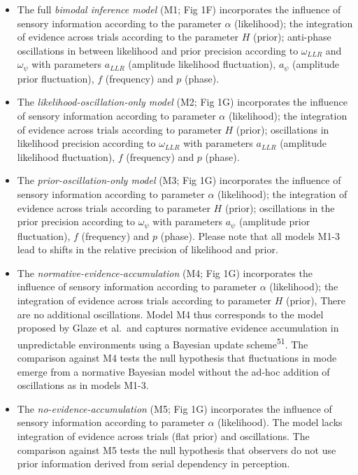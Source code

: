 \documentclass[
]{article}
\begin{document}
\begin{itemize}
\item
  The full \emph{bimodal inference model} (M1; Fig 1F) incorporates
  the influence of sensory information according to the parameter
  \(\alpha\) (likelihood); the integration of evidence across trials
  according to the parameter \(H\) (prior); anti-phase oscillations in
  between likelihood and prior precision according to \(\omega_{LLR}\)
  and \(\omega_{\psi}\) with parameters \(a_{LLR}\) (amplitude
  likelihood fluctuation), \(a_{\psi}\) (amplitude prior fluctuation),
  \(f\) (frequency) and \(p\) (phase).
\item
  The \emph{likelihood-oscillation-only model} (M2; Fig 1G)
  incorporates the influence of sensory information according to
  parameter \(\alpha\) (likelihood); the integration of evidence across
  trials according to parameter \(H\) (prior); oscillations in
  likelihood precision according to \(\omega_{LLR}\) with parameters
  \(a_{LLR}\) (amplitude likelihood fluctuation), \(f\) (frequency) and
  \(p\) (phase).
\item
  The \emph{prior-oscillation-only model} (M3; Fig 1G) incorporates
  the influence of sensory information according to parameter \(\alpha\)
  (likelihood); the integration of evidence across trials according to
  parameter \(H\) (prior); oscillations in the prior precision according
  to \(\omega_{\psi}\) with parameters \(a_{\psi}\) (amplitude prior
  fluctuation), \(f\) (frequency) and \(p\) (phase). Please note that
  all models M1-3 lead to shifts in the relative precision of likelihood
  and prior.
\item
  The \emph{normative-evidence-accumulation} (M4; Fig 1G)
  incorporates the influence of sensory information according to
  parameter \(\alpha\) (likelihood); the integration of evidence across
  trials according to parameter \(H\) (prior), There are no additional
  oscillations. Model M4 thus corresponds to the model proposed by Glaze
  et al.~and captures normative evidence accumulation in unpredictable
  environments using a Bayesian update scheme\textsuperscript{51}. The
  comparison against M4 tests the null hypothesis that fluctuations in
  mode emerge from a normative Bayesian model without the ad-hoc
  addition of oscillations as in models M1-3.
\item
  The \emph{no-evidence-accumulation} (M5; Fig 1G) incorporates the
  influence of sensory information according to parameter \(\alpha\)
  (likelihood). The model lacks integration of evidence across trials
  (flat prior) and oscillations. The comparison against M5 tests the
  null hypothesis that observers do not use prior information derived
  from serial dependency in perception.
\end{itemize}
\end{document}
